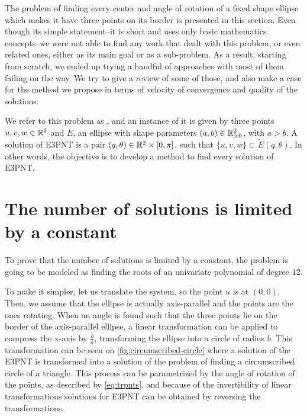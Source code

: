 The problem of finding every center and angle of rotation of a fixed shape ellipse which makes it have three points on its border is presented in this section. Even though its simple statement--it is short and uses only basic mathematics concepts--we were not able to find any work that dealt with this problem, or even related ones, either as its main goal or as a sub-problem. As a result, starting from scratch, we ended up trying a handful of approaches with most of them failing on the way. We try to give a review of some of those, and also make a case for the method we propose in terms of velocity of convergence and quality of the solutions.

We refer to this problem as , and an instance of it is given by three points $u, v, w \in \mathbb{R}^2$ and $E$, an ellipse with shape parameters $(a, b) \in \mathbb{R}^2_{>0}$, with $a > b$. A solution of E3PNT is a pair $(q, \theta) \in \mathbb{R}^2\times[0, \pi]$, such that $\{u, v, w\} \subset \tilde{E}(q, \theta)$. In other words, the objective is to develop a method to find every solution of E3PNT.

\section{The number of solutions is limited by a constant}

To prove that the number of solutions is limited by a constant, the problem is going to be modeled as finding the roots of an univariate polynomial of degree $12$.

To make it simpler, let us translate the system, so the point $u$ is at $(0,0)$. Then, we assume that the ellipse is actually axis-parallel and the points are the ones rotating. When an angle is found such that the three points lie on the border of the axis-parallel ellipse, a linear transformation can be applied to compress the x-axis by $\frac{b}{a}$, transforming the ellipse into a circle of radius $b$. This transformation can be seen on \autoref{fig:circumscribed-circle} where a solution of the E3PNT is transformed into a solution of the problem of finding a circumscribed circle of a triangle. 
This process can be parametrized by the angle of rotation of the points, as described by \autoref{eq:trpnts}, and because of the invertibility of linear transformations solutions for E3PNT can be obtained by reversing the transformations.

